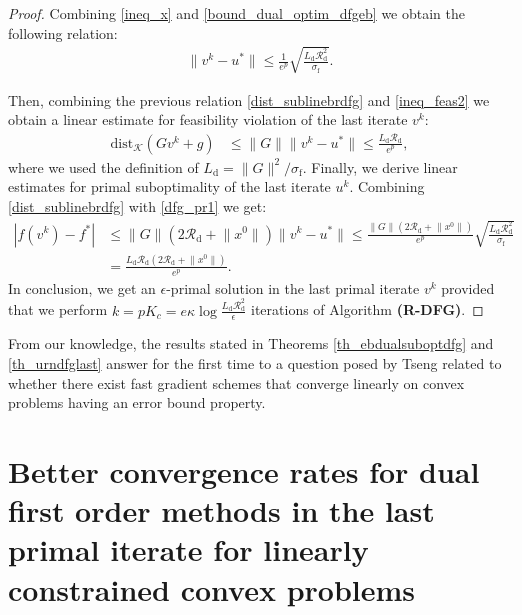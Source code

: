 \documentclass{gOMS2e}
\theoremstyle{plain}
\theoremstyle{definition}
\theoremstyle{remark}
\providecommand{\norm}[1]{\lVert#1\rVert}
\begin{document}
\begin{proof}
Combining \eqref{ineq_x} and \eqref{bound_dual_optim_dfgeb} we obtain the
following  relation:
\begin{align}
\label{dist_sublinebrdfg} \| v^k - u^* \| \leq  \frac{1}{e^p}  \sqrt{\frac{L_\text{d} \mathcal{R}_\text{d}^2}{\sigma_\text{f}}}.
\end{align}

\noindent Then, combining the previous relation
\eqref{dist_sublinebrdfg} and \eqref{ineq_feas2} we obtain a linear
estimate for feasibility violation of the last iterate $v^k$:
\begin{align}
\label{fes_sublinebdfg} \text{dist}_{\mathcal{K}}(G v^k + g) & \leq   \|G\|   \| {}{v}^k -
u^* \|  \leq  \frac{L_\text{d} \mathcal{R}_\text{d}}{e^p},
\end{align}
where we used the definition of  $L_\text{d} =
\|G\|^2/\sigma_\text{f}$. Finally, we derive linear estimates for
primal suboptimality of the last iterate $u^k$. Combining
\eqref{dist_sublinebrdfg} with \eqref{dfg_pr1}  we get:
\begin{align}
\label{opt_sublinebdfg}
|f(v^k) - f^*| & \leq \norm{G}(2\mathcal{R}_{\text{d}} + \norm{x^0}) \| v^k - u^* \| \leq  \frac{\norm{G}(2\mathcal{R}_{\text{d}} + \norm{x^0})}{e^p}  \sqrt{\frac{L_\text{d} \mathcal{R}_\text{d}^2}{\sigma_\text{f}}}  \nonumber \\
& = \frac{L_\text{d} \mathcal{R}_\text{d} (2\mathcal{R}_{\text{d}} + \norm{x^0})}{e^p} .
\end{align}
In conclusion, we get an
$\epsilon$-primal solution in the last primal iterate $v^{k}$ provided that we perform $k = p K_c = e  \kappa  \log \frac{L_\text{d} \mathcal{R}_\text{d}^2}{\epsilon}$  iterations of Algorithm \textbf{(R-DFG)}.
\end{proof}

\noindent From our knowledge, the results stated in  Theorems
\ref{th_ebdualsuboptdfg} and \ref{th_urndfglast} answer for the
first time to a question posed by Tseng \cite{Tse:10} related to
whether there exist fast gradient schemes  that converge linearly
on convex problems having an error bound property.

\section{Better convergence rates  for dual
first order methods in the last primal iterate for
linearly constrained convex problems}
\label{extensions}
\end{document}
